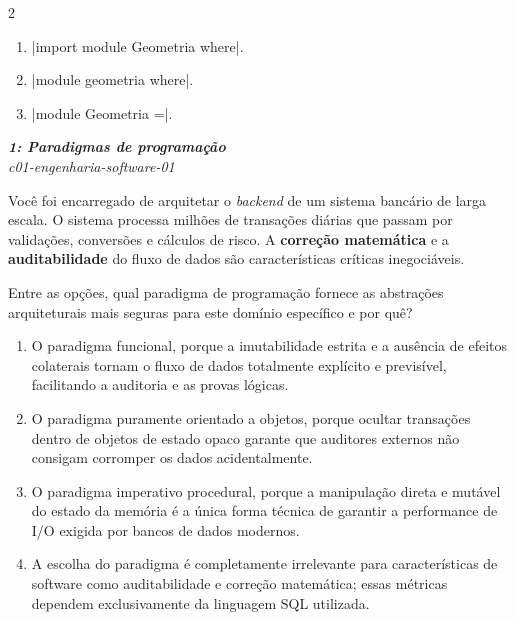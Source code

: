 \documentclass[a4paper,10pt,brazil]{article}
\begin{document}
\begin{multicols}{2}
\begin{enumerate}
  \item \haskellinline|import module Geometria where|.

  \item \haskellinline|module geometria where|.

  \item \haskellinline|module Geometria =|.


\end{enumerate}

\begin{flushright}
  \footnotesize
  \textit{\textbf{1: Paradigmas de programação}}\\
  \textit{c01-engenharia-software-01}\\

\end{flushright}
Você foi encarregado de arquitetar o \emph{backend} de um sistema bancário de larga escala. O sistema processa milhões de transações diárias que passam por validações, conversões e cálculos de risco. A \textbf{correção matemática} e a \textbf{auditabilidade} do fluxo de dados são características críticas inegociáveis.

Entre as opções, qual paradigma de programação fornece as abstrações arquiteturais mais seguras para este domínio específico e por quê?

\begin{enumerate}
  \item O paradigma funcional, porque a imutabilidade estrita e a ausência de efeitos colaterais tornam o fluxo de dados totalmente explícito e previsível, facilitando a auditoria e as provas lógicas.

  \item O paradigma puramente orientado a objetos, porque ocultar transações dentro de objetos de estado opaco garante que auditores externos não consigam corromper os dados acidentalmente.

  \item O paradigma imperativo procedural, porque a manipulação direta e mutável do estado da memória é a única forma técnica de garantir a performance de I/O exigida por bancos de dados modernos.

  \item A escolha do paradigma é completamente irrelevante para características de software como auditabilidade e correção matemática; essas métricas dependem exclusivamente da linguagem SQL utilizada.


\end{enumerate}
\end{multicols}
\end{document}

